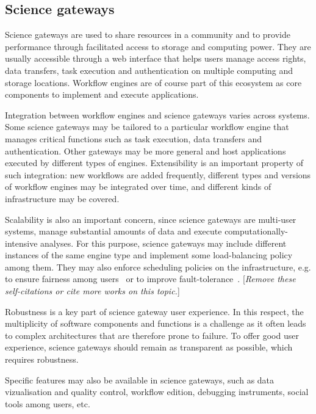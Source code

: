 \documentclass[preprint,3p,twocolumn]{elsarticle}
\newcommand{\todo}[1]{\color{blue}\xspace[\emph{#1}]\xspace\color{black}}
\begin{document}
\subsection{Science gateways}

Science gateways 
are used to share resources in a community and to provide performance
through facilitated access to storage and computing power. They are
usually accessible through a web interface that helps users manage
access rights, data transfers, task execution and authentication on
multiple computing and storage locations. Workflow engines are of
course part of this ecosystem as core components to implement and
execute applications.


Integration between workflow engines and science gateways varies
across systems. Some science gateways may be tailored to a particular
workflow engine that manages critical functions such as task
execution, data transfers and authentication. Other gateways may be
more general and host applications executed by different types of
engines. Extensibility is an important property of such integration:
new workflows are added frequently, different types and versions of
workflow engines may be integrated over time, and different kinds of
infrastructure may be covered.

Scalability is also an important concern, since science gateways are
multi-user systems, manage substantial amounts of data and execute
computationally-intensive analyses. For this purpose, science gateways
may include different instances of the same engine type and implement
some load-balancing policy among them. They may also enforce
scheduling policies on the infrastructure, e.g. to ensure fairness
among users~\cite{FERR-14} or to improve
fault-tolerance~\cite{FERR-13}. \todo{Remove these self-citations or
  cite more works on this topic.}

Robustness is a key part of science gateway user experience. In this
respect, the multiplicity of software components and functions is a
challenge as it often leads to complex architectures that are
therefore prone to failure. To offer good user experience, science
gateways should remain as transparent as possible, which requires
robustness. 

Specific features may also be available in science
gateways, such as data vizualisation and quality control, workflow
edition, debugging instruments, social tools among users, etc.
\end{document}
